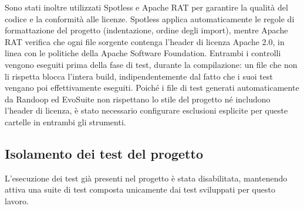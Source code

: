 Sono stati inoltre utilizzati Spotless e Apache RAT per garantire la
qualità del codice e la conformità alle licenze. Spotless applica
automaticamente le regole di formattazione del progetto (indentazione,
ordine degli import), mentre Apache RAT verifica che ogni file sorgente
contenga l'header di licenza Apache 2.0, in linea con le politiche della
Apache Software Foundation. Entrambi i controlli vengono eseguiti prima
della fase di test, durante la compilazione: un file che non li rispetta
blocca l'intera build, indipendentemente dal fatto che i suoi test
vengano poi effettivamente eseguiti. Poiché i file di test generati
automaticamente da Randoop ed EvoSuite non rispettano lo stile del
progetto né includono l'header di licenza, è stato necessario
configurare esclusioni esplicite per queste cartelle in entrambi gli
strumenti.

\subsection{Isolamento dei test del progetto}

L'esecuzione dei test già presenti nel progetto è stata disabilitata,
mantenendo attiva una suite di test composta unicamente dai test
sviluppati per questo lavoro.